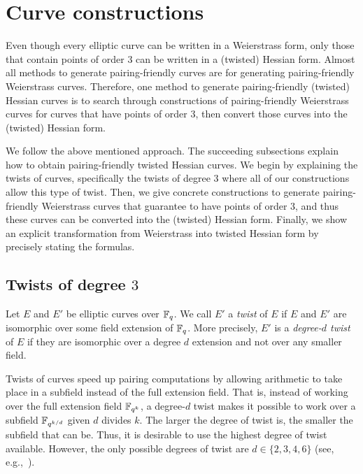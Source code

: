 \section{Curve constructions}
\label{sec:curves}

Even though every elliptic curve can be written in a Weierstrass form,
only those that contain points of order 3 can be written in a (twisted) Hessian form.
Almost all methods to generate pairing-friendly curves are for generating
pairing-friendly Weierstrass curves.
Therefore, one method to generate pairing-friendly (twisted) Hessian curves is to
search through constructions of pairing-friendly Weierstrass curves for curves that have points of order 3,
then convert those curves into the (twisted) Hessian form.

We follow the above mentioned approach.
The succeeding subsections explain how to obtain pairing-friendly twisted Hessian curves.
We begin by explaining the twists of curves, specifically the twists of degree $3$
where all of our constructions allow this type of twist.
Then, we give concrete constructions to generate pairing-friendly Weierstrass curves that guarantee to have points of order 3,
and thus these curves can be converted into the (twisted) Hessian form.
Finally, we show an explicit transformation from Weierstrass into twisted Hessian form by precisely stating the formulas.


\subsection{Twists of degree $3$}
\label{twist}
Let $E$ and $E'$ be elliptic curves over $\mathbb{F}_{q}$.
We call $E'$ a \emph{twist} of $E$ if $E$ and $E'$ are isomorphic over some field extension of $\mathbb{F}_{q}$.
More precisely, $E'$ is a {\emph{degree-$d$ twist}} of $E$ if they are isomorphic over a degree $d$ extension and not over any smaller field.

Twists of curves speed up pairing computations by allowing arithmetic to take place in a subfield instead of the full extension field.
That is, instead of working over the full extension field $\mathbb{F}_{q^k}$, a degree-$d$ twist makes it possible to work over a subfield $\mathbb{F}_{q^{k/d}}$
given $d$ divides $k$.
The larger the degree of twist is, the smaller the subfield that can be.
Thus, it is desirable to use the highest degree of twist available.
However, the only possible degrees of twist are $d \in \{2,3,4,6\}$ (see, e.g.,~\cite{2009/silverman-arithmetic}).

